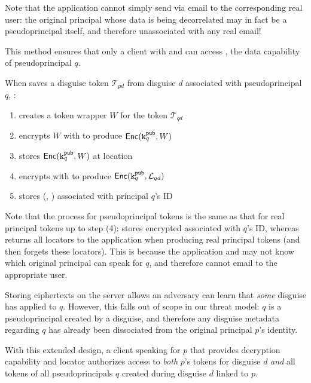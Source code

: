 Note that the application cannot simply send  via \eg email to the corresponding
real user: the original principal whose data is being decorrelated may in fact be a pseudoprincipal
itself, and therefore unassociated with any real email!

This method ensures that only a client with  and  can access , the data
capability of pseudoprincipal $q$. 

When \sys saves a disguise token $\mathcal{T}_{pd}$ from disguise $d$ associated with pseudoprincipal $q$, \sys:
\begin{enumerate}
    \item creates a token wrapper $W$ for the token $\mathcal{T}_{qd}$
    \item encrypts $W$ with  to produce $\mathsf{Enc}(\texttt{\ensuremath{\texttt{k}^{\text{pub}}_{q}}}, W)$
    \item stores $\mathsf{Enc}(\texttt{\ensuremath{\texttt{k}^{\text{pub}}_{q}}}, W)$ at location 
    \item encrypts  with  to produce $\mathsf{Enc}(\texttt{\ensuremath{\texttt{k}^{\text{pub}}_{q}}}, \mathcal{L}_{qd})$
    \item stores \enc(, ) associated with principal $q$'s ID
\end{enumerate}
Note that the process for pseudoprincipal tokens is the same as that for real principal tokens up to
step (4): \sys stores encrypted  associated with $q$'s ID, whereas \sys returns all locators to
the application when producing real principal tokens (and then forgets these locators).
This is because the application and \sys may not know which original principal can speak for $q$,
and therefore cannot \eg email  to the appropriate user.

Storing  ciphertexts on the server allows an adversary can learn that \emph{some} disguise has
applied to $q$. However, this falls out of scope in our threat model: $q$ is a pseudoprincipal
created by a disguise, and therefore any disguise metadata regarding $q$ has already been
dissociated from the original principal $p$'s identity.

With this extended design, a client speaking for $p$ that provides decryption capability 
and locator  authorizes access to \emph{both} $p$'s tokens for disguise $d$ \emph{and} all
tokens of all pseudoprincipals $q$ created during disguise $d$ linked to $p$.

